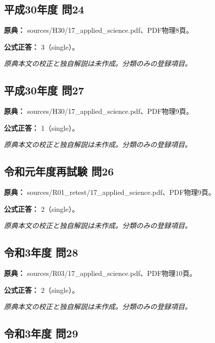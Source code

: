 \subsection{平成30年度 問24}
\label{q:h30-reg-applied-24}

\noindent\textbf{原典：} sources/H30/17\_applied\_science.pdf、PDF物理8頁。

\textbf{公式正答：} 3（single）。

\par\textit{原典本文の校正と独自解説は未作成。分類のみの登録項目。}

\subsection{平成30年度 問27}
\label{q:h30-reg-applied-27}

\noindent\textbf{原典：} sources/H30/17\_applied\_science.pdf、PDF物理9頁。

\textbf{公式正答：} 1（single）。

\par\textit{原典本文の校正と独自解説は未作成。分類のみの登録項目。}

\subsection{令和元年度再試験 問26}
\label{q:r01-ret-applied-26}

\noindent\textbf{原典：} sources/R01\_retest/17\_applied\_science.pdf、PDF物理9頁。

\textbf{公式正答：} 2（single）。

\par\textit{原典本文の校正と独自解説は未作成。分類のみの登録項目。}

\subsection{令和3年度 問28}
\label{q:r03-reg-applied-28}

\noindent\textbf{原典：} sources/R03/17\_applied\_science.pdf、PDF物理10頁。

\textbf{公式正答：} 2（single）。

\par\textit{原典本文の校正と独自解説は未作成。分類のみの登録項目。}

\subsection{令和3年度 問29}
\label{q:r03-reg-applied-29}

